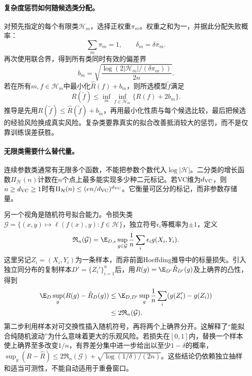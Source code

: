 \paragraph{复杂度惩罚如何随候选类分配。}
对预先指定的每个有限类$\mathcal H_m$，选择正权重$\pi_m$。权重之和为一，并据此分配失败概率：
\begin{equation*}
 \sum_m\pi_m=1,\qquad \delta_m=\delta\pi_m.
\end{equation*}
再次使用联合界，得到所有类同时有效的偏差界
\begin{equation}
 b_m=\sqrt{\frac{\log(2|\mathcal H_m|/(\delta\pi_m))}{2n}}.
\end{equation}
若在所有$m,f\in\mathcal H_m$中最小化$\hat R(f)+b_m$，则所选模型$\tilde f$满足
\begin{equation}
 R(\tilde f)\leq\inf_m\inf_{f\in\mathcal H_m}\{R(f)+2b_m\}.
\end{equation}
推导是先用$R(\tilde f)\leq\hat R(\tilde f)+b_{\tilde m}$，再用最小化性质与每个候选比较，最后把候选的经验风险换成真实风险。复杂类要靠真实的拟合改善抵消较大的惩罚，而不是仅靠训练误差获胜。

\paragraph{无限类需要什么替代量。}
连续参数类通常有无限多个函数，不能把参数个数代入$\log|\mathcal H|$。二分类的增长函数$\Pi_{\mathcal H}(n)$计数在$n$个点上最多能实现多少种二元标记。若VC维为$d_{\rm VC}$，则$n\geq d_{\rm VC}\geq1$时有$\Pi_{\mathcal H}(n)\leq(en/d_{\rm VC})^{d_{\rm VC}}$。它衡量可区分的标记，而非参数存储量。

另一个视角是随机符号拟合能力。令损失类$\mathcal G=\{(x,y)\mapsto\ell(f(x),y):f\in\mathcal H\}$，独立符号$\epsilon_i$等概率为$\pm1$，定义
\begin{equation}
 \mathfrak R_n(\mathcal G)=\E_{D,\epsilon}\sup_{g\in\mathcal G}
 \frac1n\sum_i\epsilon_i g(X_i,Y_i).
\end{equation}
这里另记$Z_i=(X_i,Y_i)$为一条样本，而非前面Hoeffding推导中的标量损失。引入独立同分布的复制样本$D'=\{Z_i'\}_{i=1}^n$后，用$R(g)=\E_{D'}\hat R_{D'}(g)$及上确界的凸性，得到
\begin{align}
 \E_D\sup_g(R(g)-\hat R_D(g))
 &\leq\E_{D,D'}\sup_g\frac1n\sum_i(g(Z_i')-g(Z_i))\\
 &\leq2\mathfrak R_n(\mathcal G).
\end{align}
第二步利用样本对可交换性插入随机符号，再将两个上确界分开。这解释了“能拟合纯随机波动”为什么意味着更大的乐观风险。若损失在$[0,1]$内，替换一个样本使上确界至多改变$1/n$，有界差分集中进一步给出以至少$1-\delta$的概率，$\sup_g(R-\hat R)\leq2\mathfrak R_n(\mathcal G)+\sqrt{\log(1/\delta)/(2n)}$。这些结论仍依赖独立抽样和适当可测性，不能自动适用于重叠窗口。

